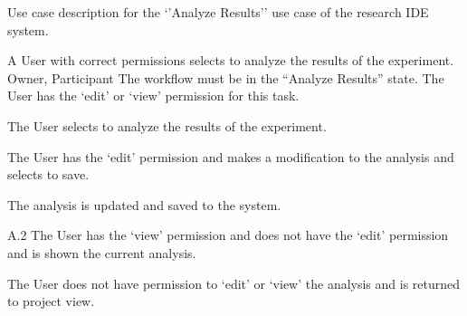 \begin{table}
  \centering
  \caption{Use case description for the `'Analyze Results'' use case of the research IDE system.}
  \label{tbl:use-case-analyze-results}

  \begin{usecase}
    A User with correct permissions selects to analyze the results of the experiment.
    Owner, Participant
    The workflow must be in the “Analyze Results” state. The User has the ‘edit’ or ‘view’ permission for this task.
    \ucnormal
    \begin{ucenum}
      \item The User selects to analyze the results of the experiment.
      \item The User has the ‘edit’ permission and makes a modification to the analysis and selects to save.
      \item The analysis is updated and saved to the system.
    \end{ucenum}
    \begin{ucenum}
      \item [A.2] The User has the ‘view’ permission and does not have the ‘edit’ permission and is shown the current analysis.
    \end{ucenum}
    The User does not have permission to ‘edit’ or ‘view’ the analysis and is returned to project view.
  \end{usecase}
\end{table}


